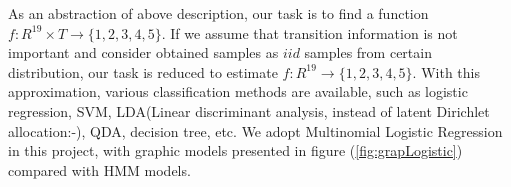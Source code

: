 As an abstraction of above description, our task is to find a function $f: R^{19}\times T \rightarrow \{1,2,3,4,5\}$. If we assume that transition information is not important and consider obtained samples as $iid$ samples from certain distribution, our task is reduced to estimate $f: R^{19} \rightarrow \{1,2,3,4,5\}$. With this approximation, various classification methods are available, such as logistic regression, SVM, LDA(Linear discriminant analysis, instead of latent Dirichlet allocation:-), QDA, decision tree, etc. We adopt Multinomial Logistic Regression in this project, with graphic models presented in figure (\ref{fig:grapLogistic}) compared with HMM models.




